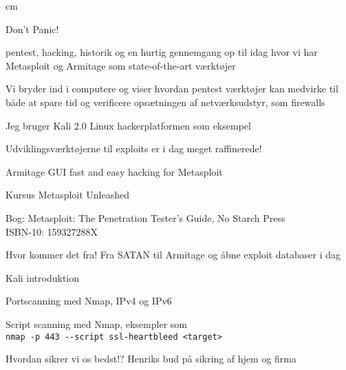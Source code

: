 \documentclass[20pt,landscape,a4paper,footrule]{foils}
\begin{document}




 cm

\centerline{\color{titlecolor}\LARGE Don't Panic!}

\begin{list1}
\item pentest, hacking, historik og en hurtig gennemgang op til idag hvor vi har Metasploit og Armitage som state-of-the-art værktøjer
\item Vi bryder ind i computere og viser hvordan pentest værktøjer kan medvirke til både at spare tid og verificere opsætningen af netværksudstyr, som firewalls
\end{list1}

\vskip 1cm
\centerline{Jeg bruger Kali 2.0 Linux hackerplatformen som eksempel}




\begin{list1}
\item Udviklingsværktøjerne til exploits er i dag meget raffinerede!
\item {}
\item Armitage GUI fast and easy hacking for Metasploit\\
\item Kursus Metasploit Unleashed\\
\item Bog: Metasploit: The Penetration Tester's Guide, No Starch Press\\
ISBN-10: 159327288X
\end{list1}




\begin{list1}
\item Hvor kommer det fra! Fra SATAN til Armitage og åbne exploit databaser i dag

\item Kali introduktion

\item Portscanning med Nmap, IPv4 og IPv6

\item Script scanning med Nmap, eksempler som\\
\verb+nmap -p 443 --script ssl-heartbleed <target>+

\item Hvordan sikrer vi os bedst!? Henriks bud på sikring af hjem og firma

\end{list1}
\end{document}
